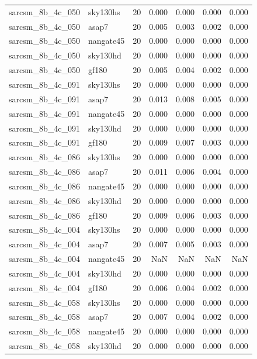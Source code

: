 \begin{tabular}{llrrrrr}
sarcsm\_8b\_4c\_050 & sky130hs & 20 & 0.000 & 0.000 & 0.000 & 0.000 \\
sarcsm\_8b\_4c\_050 & asap7 & 20 & 0.005 & 0.003 & 0.002 & 0.000 \\
sarcsm\_8b\_4c\_050 & nangate45 & 20 & 0.000 & 0.000 & 0.000 & 0.000 \\
sarcsm\_8b\_4c\_050 & sky130hd & 20 & 0.000 & 0.000 & 0.000 & 0.000 \\
sarcsm\_8b\_4c\_050 & gf180 & 20 & 0.005 & 0.004 & 0.002 & 0.000 \\
sarcsm\_8b\_4c\_091 & sky130hs & 20 & 0.000 & 0.000 & 0.000 & 0.000 \\
sarcsm\_8b\_4c\_091 & asap7 & 20 & 0.013 & 0.008 & 0.005 & 0.000 \\
sarcsm\_8b\_4c\_091 & nangate45 & 20 & 0.000 & 0.000 & 0.000 & 0.000 \\
sarcsm\_8b\_4c\_091 & sky130hd & 20 & 0.000 & 0.000 & 0.000 & 0.000 \\
sarcsm\_8b\_4c\_091 & gf180 & 20 & 0.009 & 0.007 & 0.003 & 0.000 \\
sarcsm\_8b\_4c\_086 & sky130hs & 20 & 0.000 & 0.000 & 0.000 & 0.000 \\
sarcsm\_8b\_4c\_086 & asap7 & 20 & 0.011 & 0.006 & 0.004 & 0.000 \\
sarcsm\_8b\_4c\_086 & nangate45 & 20 & 0.000 & 0.000 & 0.000 & 0.000 \\
sarcsm\_8b\_4c\_086 & sky130hd & 20 & 0.000 & 0.000 & 0.000 & 0.000 \\
sarcsm\_8b\_4c\_086 & gf180 & 20 & 0.009 & 0.006 & 0.003 & 0.000 \\
sarcsm\_8b\_4c\_004 & sky130hs & 20 & 0.000 & 0.000 & 0.000 & 0.000 \\
sarcsm\_8b\_4c\_004 & asap7 & 20 & 0.007 & 0.005 & 0.003 & 0.000 \\
sarcsm\_8b\_4c\_004 & nangate45 & 20 & NaN & NaN & NaN & NaN \\
sarcsm\_8b\_4c\_004 & sky130hd & 20 & 0.000 & 0.000 & 0.000 & 0.000 \\
sarcsm\_8b\_4c\_004 & gf180 & 20 & 0.006 & 0.004 & 0.002 & 0.000 \\
sarcsm\_8b\_4c\_058 & sky130hs & 20 & 0.000 & 0.000 & 0.000 & 0.000 \\
sarcsm\_8b\_4c\_058 & asap7 & 20 & 0.007 & 0.004 & 0.002 & 0.000 \\
sarcsm\_8b\_4c\_058 & nangate45 & 20 & 0.000 & 0.000 & 0.000 & 0.000 \\
sarcsm\_8b\_4c\_058 & sky130hd & 20 & 0.000 & 0.000 & 0.000 & 0.000 \\

\end{tabular}
